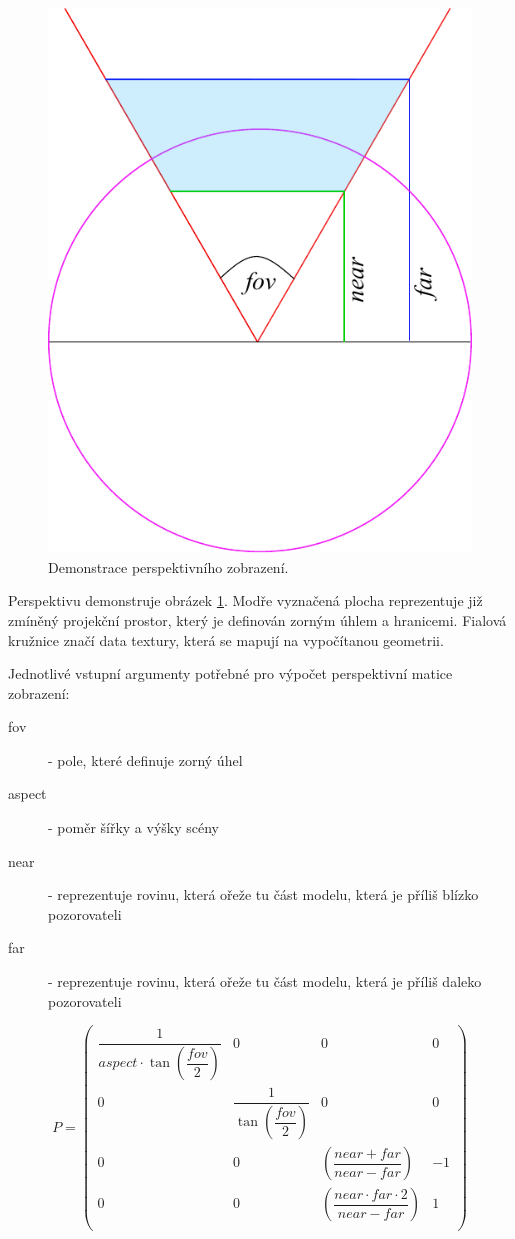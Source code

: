 \begin{figure}[h]
	\label{img:perspective_matrix}
	\centering
	\includegraphics[scale=1.0,angle=0,width=0.45\linewidth]{obrazky-figures/perspective_matrix}
	\caption{Demonstrace perspektivního zobrazení.}
\end{figure}

Perspektivu demonstruje obrázek \ref{img:perspective_matrix}. Modře vyznačená plocha reprezentuje již zmíněný projekční prostor, který je definován  zorným úhlem a hranicemi. Fialová kružnice značí data textury, která se mapují na vypočítanou geometrii.

\newpage

Jednotlivé vstupní argumenty potřebné pro výpočet perspektivní matice zobrazení:

\begin{description}
		\item[fov] - pole, které definuje zorný úhel
		\item[aspect] - poměr šířky a výšky scény
		\item[near] - reprezentuje rovinu, která ořeže tu část modelu, která je příliš blízko pozorovateli
		\item[far] - reprezentuje rovinu, která ořeže tu část modelu, která je příliš daleko pozorovateli
\end{description}


$$
P =
\begin{pmatrix} 
\dfrac{1}{aspect \cdot \tan\left(\dfrac{ fov }{2}\right)} & 0 & 0 & 0\\
0 & \dfrac{1}{\tan\left(\dfrac{ fov }{2}\right)} & 0 & 0\\ 
0 & 0 & \left(\dfrac{near+far}{near-far}\right) & -1\\ 
0 & 0 &  \left(\dfrac{near \cdot far \cdot 2}{near-far}\right)  & 1\\ 
\end{pmatrix}
$$



